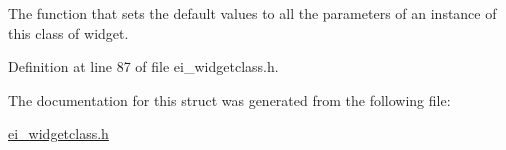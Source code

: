 The function that sets the default values to all the parameters of an instance of this class of widget. 



Definition at line 87 of file ei\-\_\-widgetclass.\-h.



The documentation for this struct was generated from the following file\-:\begin{DoxyCompactItemize}
\item 
\hyperlink{ei__widgetclass_8h}{ei\-\_\-widgetclass.\-h}\end{DoxyCompactItemize}
